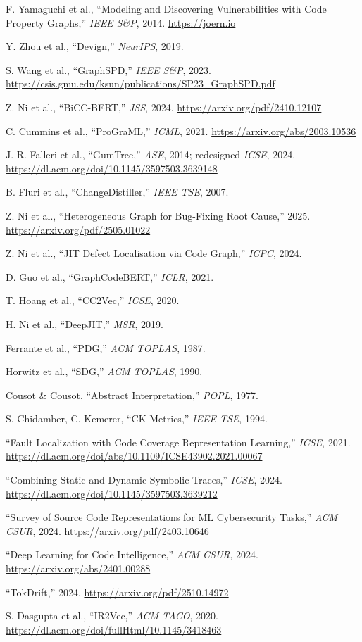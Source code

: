 \documentclass[12pt,a4paper]{article}
\begin{document}
\begin{enumerate}[leftmargin=1.5em, label={[\arabic*]}]
  \item F. Yamaguchi et al., ``Modeling and Discovering Vulnerabilities with Code
        Property Graphs,'' \textit{IEEE S\&P}, 2014. \url{https://joern.io}
  \item Y. Zhou et al., ``Devign,'' \textit{NeurIPS}, 2019.
  \item S. Wang et al., ``GraphSPD,'' \textit{IEEE S\&P}, 2023.
        \url{https://csis.gmu.edu/ksun/publications/SP23_GraphSPD.pdf}
  \item Z. Ni et al., ``BiCC-BERT,'' \textit{JSS}, 2024.
        \url{https://arxiv.org/pdf/2410.12107}
  \item C. Cummins et al., ``ProGraML,'' \textit{ICML}, 2021.
        \url{https://arxiv.org/abs/2003.10536}
  \item J.-R. Falleri et al., ``GumTree,'' \textit{ASE}, 2014;
        redesigned \textit{ICSE}, 2024.
        \url{https://dl.acm.org/doi/10.1145/3597503.3639148}
  \item B. Fluri et al., ``ChangeDistiller,'' \textit{IEEE TSE}, 2007.
  \item Z. Ni et al., ``Heterogeneous Graph for Bug-Fixing Root Cause,''
        2025. \url{https://arxiv.org/pdf/2505.01022}
  \item Z. Ni et al., ``JIT Defect Localisation via Code Graph,'' \textit{ICPC},
        2024.
  \item D. Guo et al., ``GraphCodeBERT,'' \textit{ICLR}, 2021.
  \item T. Hoang et al., ``CC2Vec,'' \textit{ICSE}, 2020.
  \item H. Ni et al., ``DeepJIT,'' \textit{MSR}, 2019.
  \item Ferrante et al., ``PDG,'' \textit{ACM TOPLAS}, 1987.
  \item Horwitz et al., ``SDG,'' \textit{ACM TOPLAS}, 1990.
  \item Cousot \& Cousot, ``Abstract Interpretation,'' \textit{POPL}, 1977.
  \item S. Chidamber, C. Kemerer, ``CK Metrics,'' \textit{IEEE TSE}, 1994.
  \item ``Fault Localization with Code Coverage Representation Learning,''
        \textit{ICSE}, 2021.
        \url{https://dl.acm.org/doi/abs/10.1109/ICSE43902.2021.00067}
  \item ``Combining Static and Dynamic Symbolic Traces,'' \textit{ICSE}, 2024.
        \url{https://dl.acm.org/doi/10.1145/3597503.3639212}
  \item ``Survey of Source Code Representations for ML Cybersecurity Tasks,''
        \textit{ACM CSUR}, 2024.
        \url{https://arxiv.org/pdf/2403.10646}
  \item ``Deep Learning for Code Intelligence,'' \textit{ACM CSUR}, 2024.
        \url{https://arxiv.org/abs/2401.00288}
  \item ``TokDrift,'' 2024. \url{https://arxiv.org/pdf/2510.14972}
  \item S. Dasgupta et al., ``IR2Vec,'' \textit{ACM TACO}, 2020.
        \url{https://dl.acm.org/doi/fullHtml/10.1145/3418463}
\end{enumerate}
\end{document}
